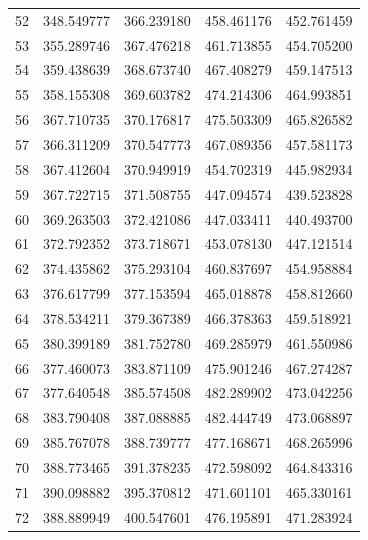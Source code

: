 \begin{table}
\begin{tabular}{rrrrr}
52 & 348.549777 & 366.239180 & 458.461176 & 452.761459 \\
53 & 355.289746 & 367.476218 & 461.713855 & 454.705200 \\
54 & 359.438639 & 368.673740 & 467.408279 & 459.147513 \\
55 & 358.155308 & 369.603782 & 474.214306 & 464.993851 \\
56 & 367.710735 & 370.176817 & 475.503309 & 465.826582 \\
57 & 366.311209 & 370.547773 & 467.089356 & 457.581173 \\
58 & 367.412604 & 370.949919 & 454.702319 & 445.982934 \\
59 & 367.722715 & 371.508755 & 447.094574 & 439.523828 \\
60 & 369.263503 & 372.421086 & 447.033411 & 440.493700 \\
61 & 372.792352 & 373.718671 & 453.078130 & 447.121514 \\
62 & 374.435862 & 375.293104 & 460.837697 & 454.958884 \\
63 & 376.617799 & 377.153594 & 465.018878 & 458.812660 \\
64 & 378.534211 & 379.367389 & 466.378363 & 459.518921 \\
65 & 380.399189 & 381.752780 & 469.285979 & 461.550986 \\
66 & 377.460073 & 383.871109 & 475.901246 & 467.274287 \\
67 & 377.640548 & 385.574508 & 482.289902 & 473.042256 \\
68 & 383.790408 & 387.088885 & 482.444749 & 473.068897 \\
69 & 385.767078 & 388.739777 & 477.168671 & 468.265996 \\
70 & 388.773465 & 391.378235 & 472.598092 & 464.843316 \\
71 & 390.098882 & 395.370812 & 471.601101 & 465.330161 \\
72 & 388.889949 & 400.547601 & 476.195891 & 471.283924 \\
\bottomrule
\end{tabular}
\end{table}

